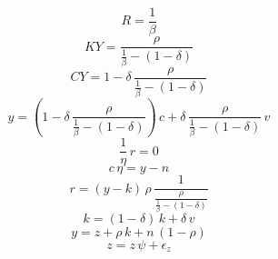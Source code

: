 \begin{dmath*}
R = \frac{1}{{{\beta}}}
\end{dmath*}
\begin{dmath*}
KY = \frac{{{\rho}}}{\frac{1}{{{\beta}}}-\left(1-{{\delta}}\right)}
\end{dmath*}
\begin{dmath*}
CY = 1-{{\delta}}\, \frac{{{\rho}}}{\frac{1}{{{\beta}}}-\left(1-{{\delta}}\right)}
\end{dmath*}
\begin{dmath}
{{y}}=\left(1-{{\delta}}\, \frac{{{\rho}}}{\frac{1}{{{\beta}}}-\left(1-{{\delta}}\right)}\right)\, {{c}}+{{\delta}}\, \frac{{{\rho}}}{\frac{1}{{{\beta}}}-\left(1-{{\delta}}\right)}\, {{v}}
\end{dmath}
\begin{dmath}
\frac{1}{{{\eta}}}\, {{r}}=0
\end{dmath}
\begin{dmath}
{{c}}\, {{\eta}}={{y}}-{{n}}
\end{dmath}
\begin{dmath}
{{r}}=\left({{y}}-{{k}}\right)\, {{\rho}}\, \frac{1}{\frac{{{\rho}}}{\frac{1}{{{\beta}}}-\left(1-{{\delta}}\right)}}
\end{dmath}
\begin{dmath}
{{k}}=\left(1-{{\delta}}\right)\, {{k}}+{{\delta}}\, {{v}}
\end{dmath}
\begin{dmath}
{{y}}={{z}}+{{\rho}}\, {{k}}+{{n}}\, \left(1-{{\rho}}\right)
\end{dmath}
\begin{dmath}
{{z}}={{z}}\, {{\psi}}+{{\epsilon_z}}
\end{dmath}
